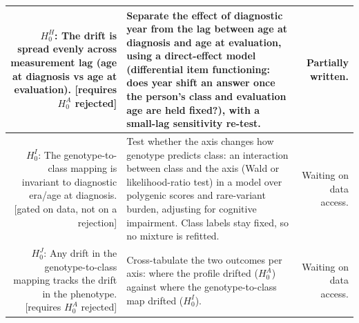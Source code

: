 \documentclass[11pt]{article}
\newcommand{\sopen}[1]{\textcolor{statusorange}{#1}}
\begin{document}
\begin{xltabular}{\textwidth}{@{} N T R @{}}
$H_0^{H}$: The drift is spread evenly across measurement lag (age at diagnosis vs age at
evaluation). [requires $H_0^{A}$ rejected] &
Separate the effect of diagnostic year from the lag between age at diagnosis and age at
evaluation, using a direct-effect model (differential item functioning: does year shift an
answer once the person's class and evaluation age are held fixed?), with a small-lag
sensitivity re-test. &
\sopen{Partially written.} \\
\midrule

$H_0^{I}$: The genotype-to-class mapping is invariant to diagnostic era/age at diagnosis.
[gated on data, not on a rejection] &
Test whether the axis changes how genotype predicts class: an interaction between class and the
axis (Wald or likelihood-ratio test) in a model over polygenic scores and rare-variant burden,
adjusting for cognitive impairment. Class labels stay fixed, so no mixture is refitted. &
\sopen{Waiting on data access.} \\
\midrule

$H_0^{J}$: Any drift in the genotype-to-class mapping tracks the drift in the phenotype.
[requires $H_0^{A}$ rejected] &
Cross-tabulate the two outcomes per axis: where the profile drifted ($H_0^{A}$) against where
the genotype-to-class map drifted ($H_0^{I}$). &
\sopen{Waiting on data access.} \\

\end{xltabular}
\normalsize

\begin{multicols}{2}
  \printbibliography
\end{multicols}
\end{document}
